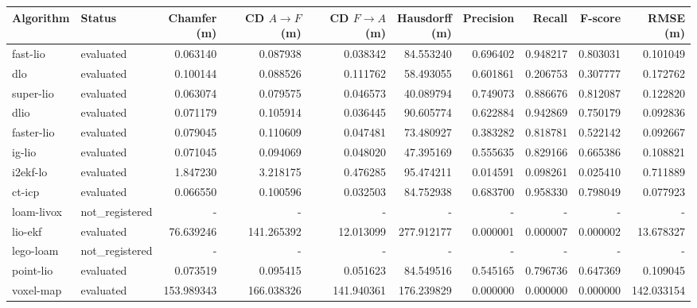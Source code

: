 \documentclass{article}
\begin{document}
\vspace*{\fill}

\begin{table}[htbp]
\centering
\small
\setlength{\tabcolsep}{3pt}
\begin{tabular}{llrrrrrrrr}
\hline
Algorithm & Status & \shortstack{Chamfer\\(m)} & \shortstack{CD $A \to F$\\(m)} & \shortstack{CD $F \to A$\\(m)} & \shortstack{Hausdorff\\(m)} & Precision & Recall & F-score & \shortstack{RMSE\\(m)} \\
\hline
fast-lio & evaluated & 0.063140 & 0.087938 & 0.038342 & 84.553240 & 0.696402 & 0.948217 & 0.803031 & 0.101049 \\
dlo & evaluated & 0.100144 & 0.088526 & 0.111762 & 58.493055 & 0.601861 & 0.206753 & 0.307777 & 0.172762 \\
super-lio & evaluated & 0.063074 & 0.079575 & 0.046573 & 40.089794 & 0.749073 & 0.886676 & 0.812087 & 0.122820 \\
dlio & evaluated & 0.071179 & 0.105914 & 0.036445 & 90.605774 & 0.622884 & 0.942869 & 0.750179 & 0.092836 \\
faster-lio & evaluated & 0.079045 & 0.110609 & 0.047481 & 73.480927 & 0.383282 & 0.818781 & 0.522142 & 0.092667 \\
ig-lio & evaluated & 0.071045 & 0.094069 & 0.048020 & 47.395169 & 0.555635 & 0.829166 & 0.665386 & 0.108821 \\
i2ekf-lo & evaluated & 1.847230 & 3.218175 & 0.476285 & 95.474211 & 0.014591 & 0.098261 & 0.025410 & 0.711889 \\
ct-icp & evaluated & 0.066550 & 0.100596 & 0.032503 & 84.752938 & 0.683700 & 0.958330 & 0.798049 & 0.077923 \\
loam-livox & not\_registered & - & - & - & - & - & - & - & - \\
lio-ekf & evaluated & 76.639246 & 141.265392 & 12.013099 & 277.912177 & 0.000001 & 0.000007 & 0.000002 & 13.678327 \\
lego-loam & not\_registered & - & - & - & - & - & - & - & - \\
point-lio & evaluated & 0.073519 & 0.095415 & 0.051623 & 84.549516 & 0.545165 & 0.796736 & 0.647369 & 0.109045 \\
voxel-map & evaluated & 153.989343 & 166.038326 & 141.940361 & 176.239829 & 0.000000 & 0.000000 & 0.000000 & 142.033154 \\

\end{tabular}
\end{table}
\end{document}
